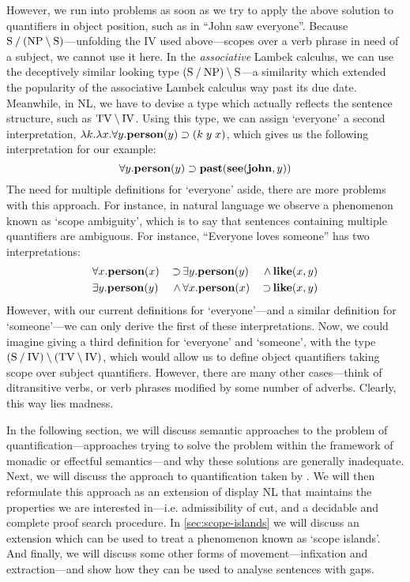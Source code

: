 \documentclass[a4paper]{article}
\begin{document}
However, we run into problems as soon as we try to apply the above
solution to quantifiers in object position, such as in ``John saw
everyone''. Because $\text{S}\mathbin{\slash}(\text{NP}\mathbin{\backslash}\text{S})$---unfolding the IV used
above---scopes over a verb phrase in need of a subject, we cannot use
it here. In the \emph{associative} Lambek calculus, we can use the
deceptively similar looking type $(\text{S}\mathbin{\slash}\text{NP})\mathbin{\backslash}\text{S}$---a similarity
which extended the popularity of the associative Lambek calculus way
past its due date. Meanwhile, in NL, we have to devise a type which
actually reflects the sentence structure, such as $\text{TV}\mathbin{\backslash}\text{IV}$. Using
this type, we can assign `everyone' a second interpretation,
$\lambda{k}.\lambda{x}.\forall{y}.\mathbf{person}(y)\supset(k\;y\;x)$, which
gives us the following interpretation for our example:
\[
  \forall{y}.\mathbf{person}(y)\supset\mathbf{past}(\mathbf{see}(\mathbf{john},y))
\]
The need for multiple definitions for `everyone' aside, there are more
problems with this approach. For instance, in natural language we
observe a phenomenon known as `scope ambiguity', which is to say that
sentences containing multiple quantifiers are ambiguous. For instance,
``Everyone loves someone'' has two interpretations:
\begin{alignat*}{3}
  &\forall x.\mathbf{person}(x) \,&\supset \,&\exists y.\mathbf{person}(y) \,&\wedge  \,&\mathbf{like}(x,y)\\
  &\exists y.\mathbf{person}(y) \,&\wedge  \,&\forall x.\mathbf{person}(x) \,&\supset \,&\mathbf{like}(x,y)
\end{alignat*}
However, with our current definitions for `everyone'---and a similar
definition for `someone'---we can only derive the first of these
interpretations. Now, we could imagine giving a third definition for
`everyone' and `someone', with the type $(\text{S}\mathbin{\slash}\text{IV})\mathbin{\backslash}(\text{TV}\mathbin{\backslash}\text{IV})$,
which would allow us to define object quantifiers taking scope over
subject quantifiers. However, there are many other cases---think of
ditransitive verbs, or verb phrases modified by some number of
adverbs. Clearly, this way lies madness.

In the following section, we will discuss semantic approaches to the
problem of quantification---approaches trying to solve the problem
within the framework of monadic or effectful semantics---and why these
solutions are generally inadequate.
Next, we will discuss the approach to quantification taken by
\citet{barker2007,barker2015}. We will then reformulate this approach
as an extension of display NL that maintains the properties we are
interested in---i.e. admissibility of cut, and a decidable and complete
proof search procedure. In \autoref{sec:scope-islands} we will discuss
an extension which can be used to treat a phenomenon known as `scope
islands'. And finally, we will discuss some other forms of
movement---infixation and extraction---and show how they can be used
to analyse sentences with gaps.
\end{document}
